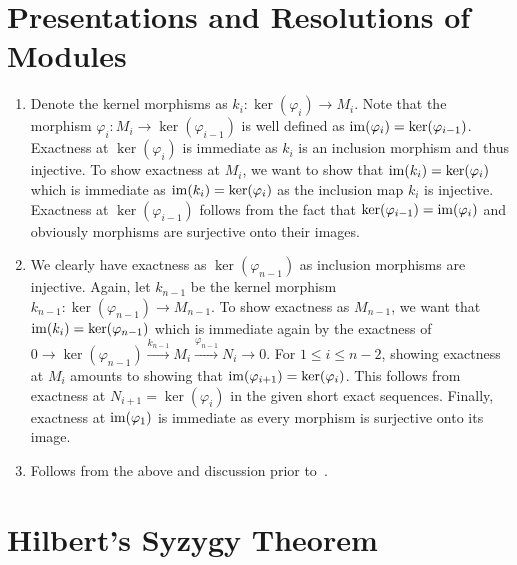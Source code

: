 \documentclass[letterpaper, 11pt, oneside]{book}
\begin{document}
\section{Presentations and Resolutions of Modules}

\begin{sol}\label{ex:UAG_6.1.7}
  \begin{enumerate}
    \item Denote the kernel morphisms as $k_{i}\colon \ker(\varphi_{i}) \to M_{i}$.
          Note that the morphism $\varphi_{i}\colon M_{i} \to \ker(\varphi_{i - 1})$ is well defined as $\operatorname{im}(\varphi_{i}) = \ker(\varphi_{i - 1})$.
          Exactness at $\ker(\varphi_{i})$ is immediate as $k_{i}$ is an inclusion morphism and thus injective.
          To show exactness at $M_{i}$, we want to show that $\operatorname{im}(k_{i}) = \ker(\varphi_{i})$ which is immediate as $\operatorname{im}(k_{i}) = \ker(\varphi_{i})$ as the inclusion map $k_{i}$ is injective.
          Exactness at $\ker(\varphi_{i - 1})$ follows from the fact that $\ker(\varphi_{i - 1}) = \operatorname{im}(\varphi_{i})$ and obviously morphisms are surjective onto their images.
    \item We clearly have exactness as $\ker(\varphi_{n - 1})$ as inclusion morphisms are injective.
          Again, let $k_{n - 1}$ be the kernel morphism $k_{n - 1}\colon \ker(\varphi_{n - 1}) \to M_{n - 1}$.
          To show exactness as $M_{n - 1}$, we want that $\operatorname{im}(k_{i}) = \ker(\varphi_{n - 1})$ which is immediate again by the exactness of $0 \to \ker(\varphi_{n - 1}) \xrightarrow{k_{n - 1}} M_{i} \xrightarrow{\varphi_{n - 1}} N_{i} \to 0$.
          For $1 \leq i \leq n - 2$, showing exactness at $M_{i}$ amounts to showing that $\operatorname{im}(\varphi_{i + 1}) = \ker(\varphi_{i})$.
          This follows from exactness at $N_{i + 1} = \ker(\varphi_{i})$ in the given short exact sequences.
          Finally, exactness at $\operatorname{im}(\varphi_{1})$ is immediate as every morphism is surjective onto its image.
    \item Follows from the above and discussion prior to~\cite[\S 6.1, Definition 1.9]{book:UAG}.
  \end{enumerate}
\end{sol}

\clearpage

\section{Hilbert's Syzygy Theorem}
\end{document}
